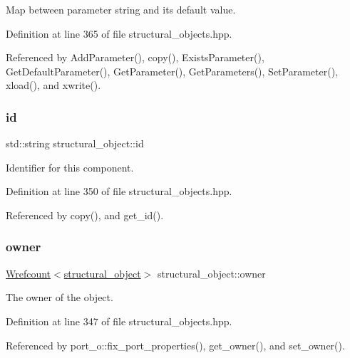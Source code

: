 Map between parameter string and its default value. 



Definition at line 365 of file structural\+\_\+objects.\+hpp.



Referenced by Add\+Parameter(), copy(), Exists\+Parameter(), Get\+Default\+Parameter(), Get\+Parameter(), Get\+Parameters(), Set\+Parameter(), xload(), and xwrite().

\mbox{\label{classstructural__object_a841a75f6e349ff7c1987dc92d4ac33a6}} 
\subsubsection{\texorpdfstring{id}{id}}
{\footnotesize\ttfamily std\+::string structural\+\_\+object\+::id\hspace{0.3cm}{\ttfamily [private]}}



Identifier for this component. 



Definition at line 350 of file structural\+\_\+objects.\+hpp.



Referenced by copy(), and get\+\_\+id().

\mbox{\label{classstructural__object_a3e96b3e00b8a78adfc44872d82e186ea}} 
\subsubsection{\texorpdfstring{owner}{owner}}
{\footnotesize\ttfamily \hyperlink{classWrefcount}{Wrefcount}$<$\hyperlink{classstructural__object}{structural\+\_\+object}$>$ structural\+\_\+object\+::owner\hspace{0.3cm}{\ttfamily [private]}}



The owner of the object. 



Definition at line 347 of file structural\+\_\+objects.\+hpp.



Referenced by port\+\_\+o\+::fix\+\_\+port\+\_\+properties(), get\+\_\+owner(), and set\+\_\+owner().

